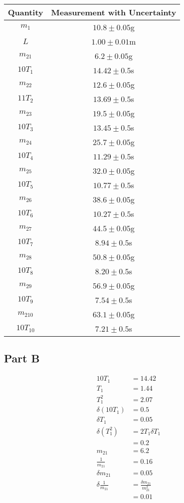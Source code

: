 \documentclass[8pt]{extarticle}
\begin{document}
{\begin{center}
	\begin{tabular}{c|c}
		Quantity & Measurement with Uncertainty \\
		\hline
		$m_1$ & $10.8 \pm 0.05$g\\
		$L$ & $1.00 \pm 0.01$m \\
		\hline
		\hline
		$m_{21}$ & $6.2 \pm 0.05$g \\
		$10T_1$ & $14.42 \pm 0.5$s \\
		\hline
		$m_{22}$ & $12.6 \pm 0.05$g \\
		$11T_2$ & $13.69 \pm 0.5$s \\
		\hline
		$m_{23}$ & $19.5 \pm 0.05$g \\
		$10T_3$ & $13.45 \pm 0.5$s \\
		\hline
		$m_{24}$ & $25.7 \pm 0.05$g \\
		$10T_4$ & $11.29 \pm 0.5$s \\
		\hline
		$m_{25}$ & $32.0 \pm 0.05$g \\
		$10T_{5}$ & $10.77 \pm 0.5$s \\
		\hline
		$m_{26}$ & $38.6 \pm 0.05$g \\
		$10T_{6}$ & $10.27 \pm 0.5$s \\
		\hline
		$m_{27}$ & $44.5\pm 0.05$g \\
		$10T_{7}$ & $8.94 \pm 0.5$s \\
		\hline
		$m_{28}$ & $50.8 \pm 0.05$g \\
		$10T_{8}$ & $8.20 \pm 0.5$s \\
		\hline
		$m_{29}$ & $56.9 \pm 0.05$g \\
		$10T_9$ & $7.54 \pm 0.5$s \\
		\hline
		$m_{210}$ & $63.1 \pm 0.05$g \\
		$10T_{10}$ & $7.21 \pm 0.5$s
	\end{tabular}
\end{center}
\subsection*{Part B}%
\label{sub:Part B}
\begin{align*}
	\label{eq:}
	10T_1 &= 14.42 \\
	T_1 &= 1.44 \\
	T_1^2 &= 2.07 \\
	\delta\left(10T_1\right) &= 0.5 \\
	\delta T_1 &= 0.05 \\
	\delta\left(T_1^2\right) &= 2T_1\delta T_1\\
	&= 0.2 \\
	m_{21} &= 6.2 \\
	\frac{1}{m_{21}} &= 0.16 \\
	\delta m_{21} &= 0.05 \\
	\delta \frac{1}{m_{21}} &= \frac{\delta m_{21}}{m_{21}^2} \\
	&= 0.01
\end{align*}
}
\end{document}
